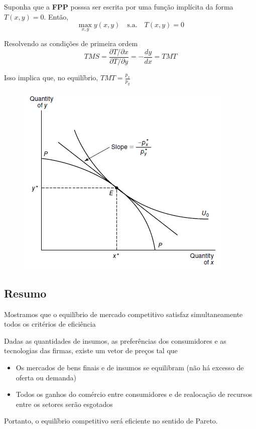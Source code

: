 \documentclass[a4paper,12pt]{article}[abntex2]
\begin{document}
Suponha que a \textbf{FPP} posssa ser escrita por uma função implícita da forma $T(x,y)=0$. Então,
\[
\max_{x,y}y(x,y) \quad \text{s.a.} \quad T(x,y)=0
\]

Resolvendo as condições de primeira ordem 
\[
TMS=\frac{\partial T/\partial x}{\partial T/\partial y}=-\frac{dy}{dx}=TMT
\]

Isso implica que, no equilíbrio, $TMT=\frac{p_x}{p_y}$

\begin{figure}[H]
    \centering
    \includegraphics[width=0.70\linewidth]{Imagens/a3i6.png}
\end{figure}

\subsection{\textbf{Resumo}}

Mostramos que o equilíbrio de mercado competitivo satisfaz simultaneamente todos os critérios de eficiência

Dadas as quantidades de insumos, as preferências dos consumidores e as tecnologias das firmas, existe um vetor de preços tal que

\begin{itemize}
    \item Os mercados de bens finais e de insumos se equilibram (não há excesso de oferta ou demanda)
    \item Todos os ganhos do comércio entre consumidores e de realocação de recursos entre os setores serão esgotados
\end{itemize}

Portanto, o equilíbrio competitivo será eficiente no sentido de Pareto.
\end{document}
